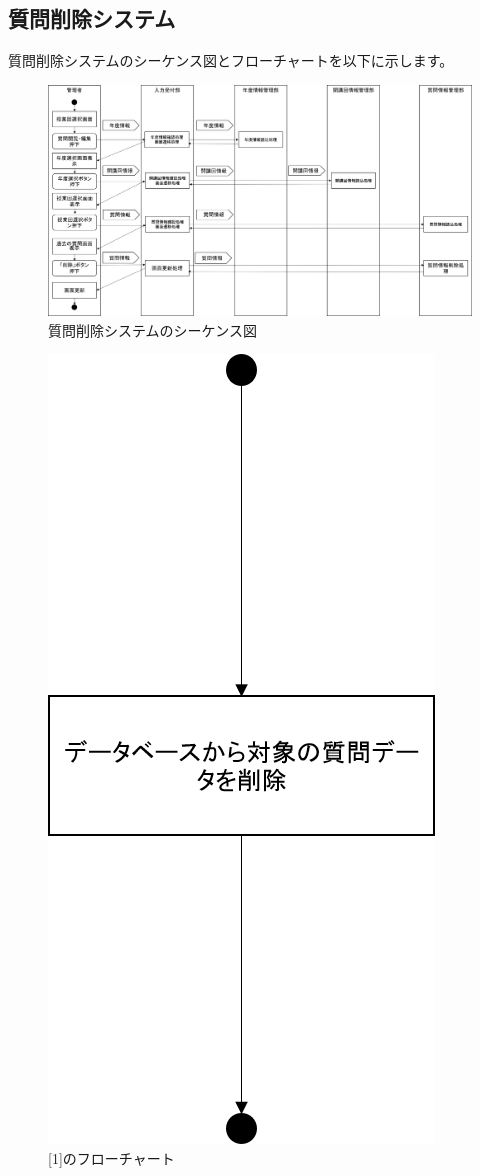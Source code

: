 \newpage
\subsection{質問削除システム}
質問削除システムのシーケンス図とフローチャートを以下に示します。

\begin{figure}[htbp]
  \begin{center}
    \includegraphics[width=1\linewidth,clip]{./img/q_delete/main.png}
    \caption{質問削除システムのシーケンス図}\label{fig:qdeleteseaquence}
  \end{center}
\end{figure}

\begin{figure}[htbp]
  \begin{center}
    \includegraphics[width=0.2\linewidth,clip]{./img/q_delete/sub1.png}
    \caption{[1]のフローチャート}\label{fig:qdeleteflow0}
  \end{center}
\end{figure}

\newpage
